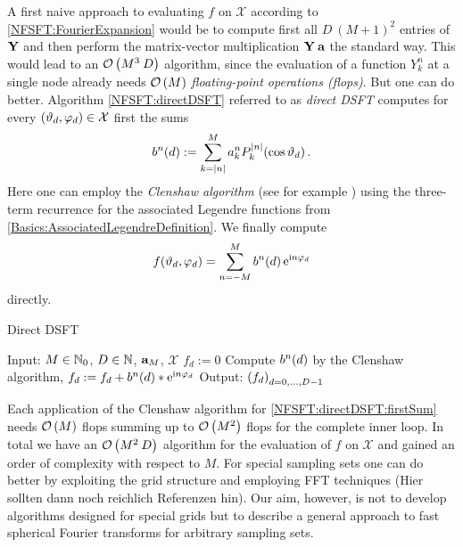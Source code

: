 A first naive approach to evaluating $f$ on $\mathcal{X}$ according to \eqref{NFSFT:FourierExpansion} would be to compute first all $D\:(M+1)^2$
entries of $\mathbf{Y}$ and then perform the matrix-vector multiplication $\mathbf{Y} \: \mathbf{a}$ the standard way. This would lead to an $\mathcal{O}\left(M^3 \: D\right)$
algorithm, since the evaluation of a function $Y_{k}^n$ at a single node already needs $\mathcal{O}\left(M\right)$ \emph{floating-point operations (flops)}.
But one can do better. Algorithm \ref{NFSFT:directDSFT} referred to as \emph{direct DSFT} computes 
for every $\left(\vartheta_{d},\varphi_{d}\right) \in \mathcal{X}$ first the sums 
\begin{equation}
  \label{NFSFT:directDSFT:firstSum}
  b^{n}{\hspace{-0.4ex}}\left(d\right) := \sum_{k=\left\vert n\right\vert}^M a_{k}^n P_{k}^{\left\vert n\right\vert}{\hspace{-0.4ex}}\left(\cos\vartheta_{d}\right). 
\end{equation}
Here one can employ the \emph{Clenshaw algorithm} (see for example \cite{prtevefl}) using the three-term recurrence 
for the associated Legendre functions from \eqref{Basics:AssociatedLegendreDefinition}. We finally compute
$$
  f{\hspace{-0.4ex}}\left(\vartheta_{d},\varphi_{d}\right) = \sum_{n=-M}^M b^{n}{\hspace{-0.4ex}}\left(d\right) \mbox{\rm{e}}^{\mbox{\scriptsize\rm{i}} n \varphi_{d}}
$$
directly.
\begin{algorithm}[b]
  \caption{Direct DSFT}
  \label{NFSFT:directDSFT}    
  \begin{algorithmic}
    \STATE  Input: $M \in \mathbb{N}_{0}$, $D \in \mathbb{N}$, $\mathbf{a}_{M}$, $\mathcal{X}$ %
    \STATE
      \STATE $f_{d} := 0$
        \STATE Compute $b^{n}{\hspace{-0.4ex}}\left(d\right)$ by the Clenshaw algorithm,
        \STATE $f_{d} := f_{d} + b^n{\hspace{-0.4ex}}\left(d\right) * \mbox{\rm{e}}^{\mbox{\scriptsize\rm{i}} n \varphi_{d}}$
      \ENDFOR
    \ENDFOR
    \STATE
    \STATE Output: $\left(f_{d}\right)_{d=0,\dots,D-1}$
\end{algorithmic}
\end{algorithm}
Each application of the Clenshaw algorithm for \eqref{NFSFT:directDSFT:firstSum} needs $\mathcal{O}\left(M\right)$ 
flops summing up to $\mathcal{O}\left(M^2\right)$ flops for the complete inner loop. In 
total we have an $\mathcal{O}\left(M^2\:D\right)$ algorithm for the evaluation of $f$ on $\mathcal{X}$ and gained an order of complexity with respect to $M$. 
For special sampling sets one can do better by exploiting the grid 
structure and employing FFT techniques (Hier sollten dann noch reichlich Referenzen hin). Our aim, however, 
is not to develop algorithms designed for special grids but to describe a general approach to fast 
spherical Fourier transforms for arbitrary sampling sets.

